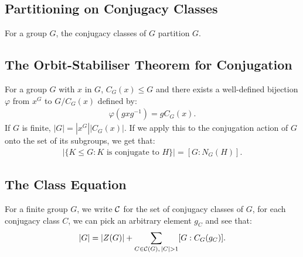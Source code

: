 \subsection{Partitioning on Conjugacy Classes}

For a group $G$, the conjugacy classes of $G$ partition $G$.

\subsection{The Orbit-Stabiliser Theorem for Conjugation}

For a group $G$ with $x$ in $G$, $C_G(x) \leq G$ and there exists
a well-defined bijection $\varphi$ from $x^G$ to $G / C_G(x)$ 
defined by: \begin{align*}
    \varphi(gxg^{-1}) = gC_G(x).
\end{align*} If $G$ is finite, $|G| = |x^G||C_G(x)|$. If we apply
this to the conjugation action of $G$ onto the set of its subgroups,
we get that: \begin{align*}
    |\{K \leq G : K \text{ is conjugate to } H\}|
    = [G : N_G(H)].
\end{align*}

\subsection{The Class Equation}

For a finite group $G$, we write $\mathcal{C}$ for the set of conjugacy classes
of $G$, for each conjugacy class $C$, we can pick an arbitrary element
$g_C$ and see that: \begin{align*}
    |G| = |Z(G)| + \sum_{C \in \mathcal{C}(G), \, |C| > 1} [G : C_G(g_C)].
\end{align*}


